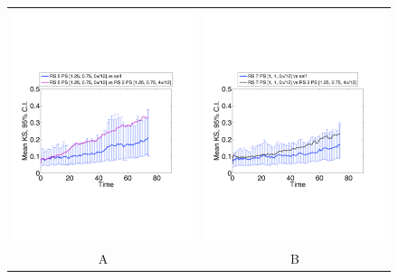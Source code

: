 \documentclass[12pt]{article}
\begin{document}
\begin{figure}[htp]
\begin{tabular}{cc}
	\includegraphics[width=3.25in]{figures/KSstat_RS05PS023_vs_RS02PS027.pdf} & \includegraphics[width=3.25in]{figures/KSstat_RS07PS023_vs_RS02PS027.pdf}\\
	A & B \\

\end{tabular}
\end{figure}
\end{document}
